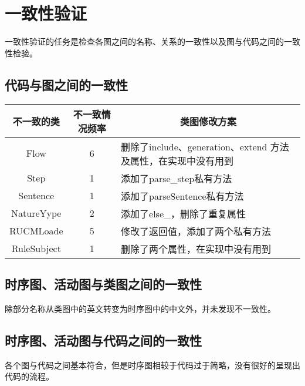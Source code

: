 \chapter{一致性验证}
一致性验证的任务是检查各图之间的名称、关系的一致性以及图与代码之间的一致性检验。
\section{代码与图之间的一致性}
\begin{table}[htbp]
    \begin{tabular}{|c|c|l|}
    \hline
    不一致的类       & 不一致情况频率 & \multicolumn{1}{c|}{类图修改方案}                 \\ \hline
    Flow        & 6       & 删除了include、generation、extend 方法及属性，在实现中没有用到 \\ \hline
    Step        & 1       & 添加了parse\_step私有方法                          \\ \hline
    Sentence    & 1       & 添加了parseSentence私有方法                        \\ \hline
    NatureYype  & 2       & 添加了else\_，删除了重复属性                           \\ \hline
    RUCMLoade   & 5       & 修改了返回值，添加了两个私有方法                            \\ \hline
    RuleSubject & 1       & 删除了两个属性，在实现中没有用到                            \\ \hline
    \end{tabular}
    \end{table}
\section{时序图、活动图与类图之间的一致性}
除部分名称从类图中的英文转变为时序图中的中文外，并未发现不一致性。
\section{时序图、活动图与代码之间的一致性}
各个图与代码之间基本符合，但是时序图相较于代码过于简略，没有很好的呈现出代码的流程。